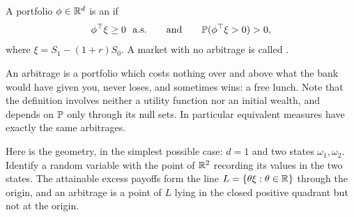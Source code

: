 \documentclass[a4paper]{scrartcl}
\begin{document}
\begin{definition}[Arbitrage]
	A portfolio $\phi \in \mathbb{R}^d$ is an  if
	$$
	\phi^\top \xi \geq 0 \ \text{ a.s.} \qquad \text{and} \qquad \mathbb{P}(\phi^\top \xi > 0) > 0,
	$$
	where $\xi = S_1 - (1+r)S_0$. A market with no arbitrage is called .
\end{definition}

An arbitrage is a portfolio which costs nothing over and above what the bank would have given you, never loses, and sometimes wins: a free lunch. Note that the definition involves neither a utility function nor an initial wealth, and depends on $\mathbb{P}$ only through its null sets. In particular equivalent measures have exactly the same arbitrages.

Here is the geometry, in the simplest possible case: $d = 1$ and two states $\omega_1, \omega_2$. Identify a random variable with the point of $\mathbb{R}^2$ recording its values in the two states. The attainable excess payoffs form the line $L = \{\theta\xi : \theta \in \mathbb{R}\}$ through the origin, and an arbitrage is a point of $L$ lying in the closed positive quadrant but not at the origin.

\begin{center}
\end{center}
\end{document}

